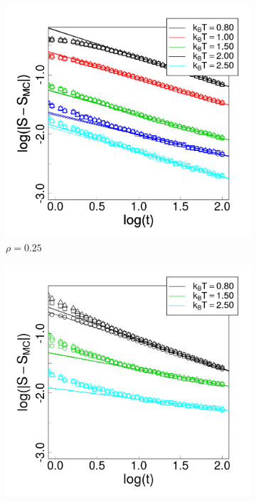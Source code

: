 \begin{figure}[h]
\centering
\begin{subfigure}[t]{0.32\textwidth}
	\centering
	\includegraphics[width=\textwidth]{Images/relax_25.png}
	\captionsetup{justification=centering, width=0.9\columnwidth}
	\caption{$\rho = 0.25$}
\end{subfigure}
\begin{subfigure}[t]{0.32\textwidth}
	\centering
	\includegraphics[width=\textwidth]{Images/relax_50.png}

\end{subfigure}
\end{figure}
